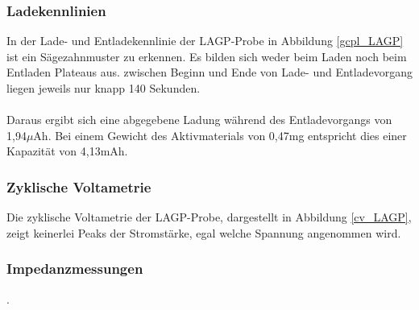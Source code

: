 \documentclass[a4paper, 11pt, headsepline,footsepline,twoside,abstract]{scrbook}
\begin{document}
\subsubsection{Ladekennlinien}
In der Lade- und Entladekennlinie der LAGP-Probe in Abbildung \ref{gcpl_LAGP} ist ein Sägezahnmuster zu erkennen. Es bilden sich weder beim Laden noch beim Entladen Plateaus aus. zwischen Beginn und Ende von Lade- und Entladevorgang liegen jeweils nur knapp 140 Sekunden.
\\\\
Daraus ergibt sich eine abgegebene Ladung während des Entladevorgangs von 1,94$\mu$Ah. Bei einem Gewicht des Aktivmaterials von 0,47mg entspricht dies einer Kapazität von 4,13mAh.
\subsubsection{Zyklische Voltametrie}
Die zyklische Voltametrie der LAGP-Probe, dargestellt in Abbildung \ref{cv_LAGP}, zeigt keinerlei Peaks der Stromstärke, egal welche Spannung angenommen wird.
\subsubsection{Impedanzmessungen}
.
\newpage
\end{document}

